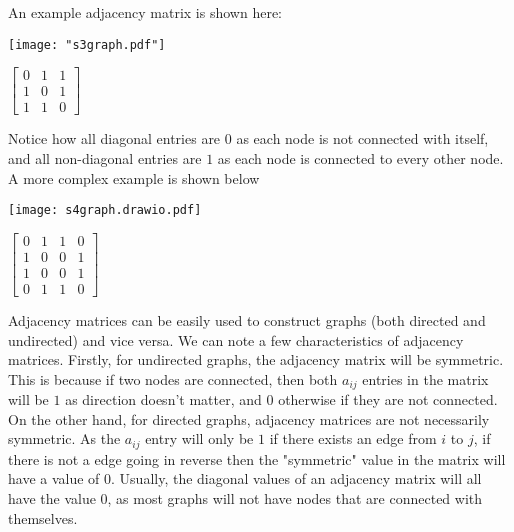 \documentclass{article}
\begin{document}
\bigskip

An example adjacency matrix is shown here:

\bigskip

\noindent\begin{minipage}{.5\textwidth}
\centering
\texttt{[image: "s3graph.pdf"]}
\label{fig:fig1}            
\end{minipage}%
\begin{minipage}{.5\textwidth}
\centering
\vspace{1.2cm}
$\begin{bmatrix}
0 & 1 & 1\\
1 & 0 & 1\\
1 & 1 & 0
\end{bmatrix}$
\vspace{1.1cm}

\label{fig:fig2}            
\end{minipage}

\bigskip

Notice how all diagonal entries are $0$ as each node is not connected with itself, 
and all non-diagonal entries are $1$ as each node is connected to every other node.
A more complex example is shown below

\bigskip

\noindent\begin{minipage}{.5\textwidth}
\centering
\texttt{[image: s4graph.drawio.pdf]}
\label{fig:fig3}            
\end{minipage}%
\begin{minipage}{.5\textwidth}
\centering
\vspace{1cm}
 $\begin{bmatrix}
0 & 1 & 1 & 0\\
1 & 0 & 0 & 1\\
1 & 0 & 0 & 1\\
0 & 1 & 1 & 0
\end{bmatrix}$
\vspace{0.88cm}

\label{fig:fig4}            
\end{minipage}

\bigskip

Adjacency matrices can be easily used to construct graphs (both directed and undirected) and vice versa.
We can note a few characteristics of adjacency matrices. Firstly, for undirected graphs, the adjacency matrix will be symmetric. 
This is because if two nodes are connected, then both $a_{ij}$ entries in the matrix will be $1$ as direction doesn't matter, and $0$ otherwise if they are not connected.
On the other hand, for directed graphs, adjacency matrices are not necessarily symmetric. 
As the $a_{ij}$ entry will only be $1$ if there exists an edge from $i$ to $j$, if there is not a edge going in reverse then the "symmetric" value in the matrix will have a value of $0$.
Usually, the diagonal values of an adjacency matrix will all have the value $0$, as most graphs will not have nodes that are connected with themselves.
\end{document}
